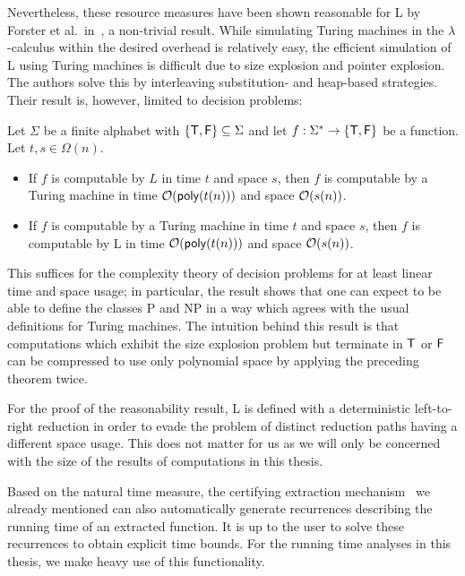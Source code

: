Nevertheless, these resource measures have been shown reasonable for L by Forster et al.\ in~\cite{ForsterKunzeRoth:2019:wcbv-Reasonable}, a non-trivial result. While simulating Turing machines in the $\lambda$-calculus within the desired overhead is relatively easy, the efficient simulation of L using Turing machines is difficult due to size explosion and pointer explosion. The authors solve this by interleaving substitution- and heap-based strategies.
Their result is, however, limited to decision problems:
\begin{theorem}
  Let $\Sigma$ be a finite alphabet with $\{\mathsf{T}, \mathsf{F}\} \subseteq \Sigma$ and let $f : \Sigma^* \rightarrow \{\mathsf{T}, \mathsf{F}\}$ be a function. Let $t, s \in \Omega(n)$. 
  \begin{itemize}
    \item If $f$ is computable by $L$ in time $t$ and space $s$, then $f$ is computable by a Turing machine in time $\mathcal{O}{(\textsf{poly}(t(n)))}$ and space $\mathcal{O}{(s(n))}$.
    \item If $f$ is computable by a Turing machine in time $t$ and space $s$, then $f$ is computable by L in time $\mathcal{O}{(\textsf{poly}(t(n)))}$ and space $\mathcal{O}{(s(n))}$. 
  \end{itemize}
\end{theorem}
This suffices for the complexity theory of decision problems for at least linear time and space usage; in particular, the result shows that one can expect to be able to define the classes \textsf{P} and \textsf{NP} in a way which agrees with the usual definitions for Turing machines. 
The intuition behind this result is that computations which exhibit the size explosion problem but terminate in $\mathsf{T}$ or $\mathsf{F}$ can be compressed to use only polynomial space by applying the preceding theorem twice.

\begin{remark}
  For the proof of the reasonability result, L is defined with a deterministic left-to-right reduction in order to evade the problem of distinct reduction paths having a different space usage. This does not matter for us as we will only be concerned with the size of the results of computations in this thesis.
\end{remark}

Based on the natural time measure, the certifying extraction mechanism~\cite{ForsterKunze:2019:Certifying-extraction} we already mentioned can also automatically generate recurrences describing the running time of an extracted function. It is up to the user to solve these recurrences to obtain explicit time bounds.
For the running time analyses in this thesis, we make heavy use of this functionality.


